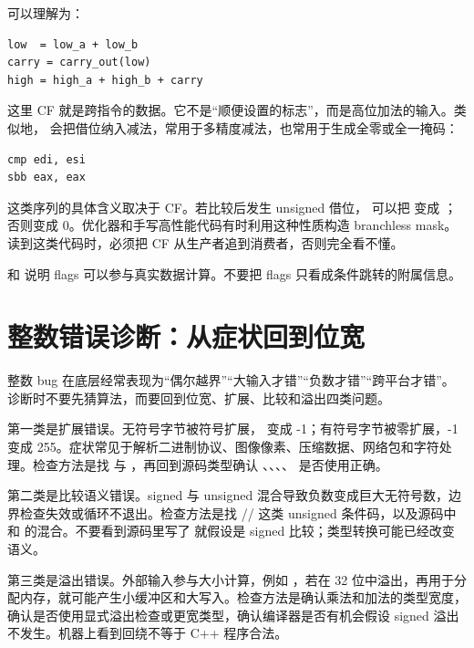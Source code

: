 可以理解为：

\begin{lstlisting}
low  = low_a + low_b
carry = carry_out(low)
high = high_a + high_b + carry
\end{lstlisting}

这里 CF 就是跨指令的数据。它不是“顺便设置的标志”，而是高位加法的输入。类似地， 会把借位纳入减法，常用于多精度减法，也常用于生成全零或全一掩码：

\begin{lstlisting}
cmp edi, esi
sbb eax, eax
\end{lstlisting}

这类序列的具体含义取决于 CF。若比较后发生 unsigned 借位， 可以把  变成 ；否则变成 0。优化器和手写高性能代码有时利用这种性质构造 branchless mask。读到这类代码时，必须把 CF 从生产者追到消费者，否则完全看不懂。

\begin{warningbox}
 和  说明 flags 可以参与真实数据计算。不要把 flags 只看成条件跳转的附属信息。
\end{warningbox}

\section{整数错误诊断：从症状回到位宽}

整数 bug 在底层经常表现为“偶尔越界”“大输入才错”“负数才错”“跨平台才错”。诊断时不要先猜算法，而要回到位宽、扩展、比较和溢出四类问题。

第一类是扩展错误。无符号字节被符号扩展， 变成 -1；有符号字节被零扩展，-1 变成 255。症状常见于解析二进制协议、图像像素、压缩数据、网络包和字符处理。检查方法是找  与 ，再回到源码类型确认 、、、、 是否使用正确。

第二类是比较语义错误。signed 与 unsigned 混合导致负数变成巨大无符号数，边界检查失效或循环不退出。检查方法是找 // 这类 unsigned 条件码，以及源码中  和  的混合。不要看到源码里写了  就假设是 signed 比较；类型转换可能已经改变语义。

第三类是溢出错误。外部输入参与大小计算，例如 ，若在 32 位中溢出，再用于分配内存，就可能产生小缓冲区和大写入。检查方法是确认乘法和加法的类型宽度，确认是否使用显式溢出检查或更宽类型，确认编译器是否有机会假设 signed 溢出不发生。机器上看到回绕不等于 C++ 程序合法。

